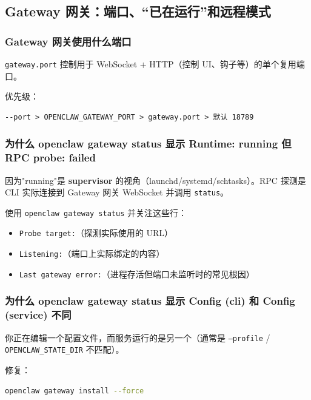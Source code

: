 \subsection{Gateway 网关：端口、“已在运行”和远程模式}


\subsubsection{Gateway 网关使用什么端口}


\texttt{gateway.port} 控制用于 WebSocket + HTTP（控制 UI、钩子等）的单个复用端口。

优先级：

\begin{lstlisting}
--port > OPENCLAW_GATEWAY_PORT > gateway.port > 默认 18789
\end{lstlisting}


\subsubsection{为什么 openclaw gateway status 显示 Runtime: running 但 RPC probe: failed}


因为"running"是 \textbf{supervisor} 的视角（launchd/systemd/schtasks）。RPC 探测是 CLI 实际连接到 Gateway 网关 WebSocket 并调用 \texttt{status}。

使用 \texttt{openclaw gateway status} 并关注这些行：

\begin{itemize}
  \item \texttt{Probe target:}（探测实际使用的 URL）
  \item \texttt{Listening:}（端口上实际绑定的内容）
  \item \texttt{Last gateway error:}（进程存活但端口未监听时的常见根因）
\end{itemize}


\subsubsection{为什么 openclaw gateway status 显示 Config (cli) 和 Config (service) 不同}


你正在编辑一个配置文件，而服务运行的是另一个（通常是 \texttt{--profile} / \texttt{OPENCLAW\_STATE\_DIR} 不匹配）。

修复：

\begin{lstlisting}[language=bash]
openclaw gateway install --force
\end{lstlisting}



